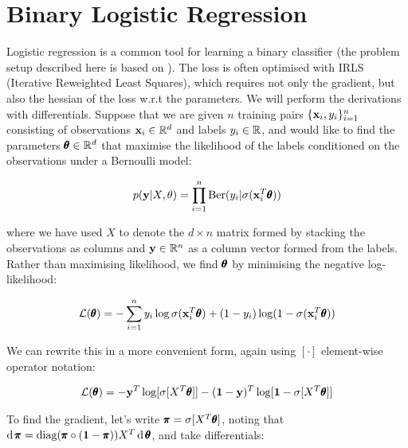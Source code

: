 \section{Binary Logistic Regression}

Logistic regression is a common tool for learning a binary classifier (the problem setup described here is based on \citep{defreitas}).  The loss is often optimised with IRLS (Iterative Reweighted Least Squares), which requires not only the gradient, but also the hessian of the loss w.r.t the parameters.  We will perform the derivations with differentials.  Suppose that we are given $n$ training pairs $\{\mathbf{x}_i, y_i\}_{i=1}^n$ consisting of observations $\mathbf{x}_i \in \mathbb{R}^d$ and labels $y_i \in \mathbb{R}$, and would like to find the parameters $\pmb{\theta} \in \mathbb{R}^d$ that maximise the likelihood of the labels conditioned on the observations under a Bernoulli model:

\begin{align*}
  p( \mathbf{y} | X, \mathbf{\theta}) = \prod_{i=1}^n \text{Ber}(y_i| \sigma(\mathbf{x}_i^T \pmb{\theta}))
\end{align*}

where we have used $X$ to denote the $d \times n$ matrix formed by stacking the observations as columns and $\mathbf{y} \in \mathbb{R}^{n} $ as a column vector formed from the labels.  Rather than maximising likelihood, we find $\pmb{\theta}$ by minimising the negative log-likelihood:

\begin{align*}
  \mathcal{L}(\pmb{\theta}) = - \sum_{i =1}^n y_i \log \sigma(\mathbf{x}_i^T\pmb{\theta}) + (1 - y_i) \log (1 - \sigma(\mathbf{x}_i^T \pmb{\theta}))
\end{align*}

We can rewrite this in a more convenient form, again using $[\cdot]$ element-wise operator notation:

\begin{align*}
  \mathcal{L}(\pmb{\theta}) = -\mathbf{y}^T \log[\sigma[X^T\pmb{\theta}]] - (\mathbf{1} - \mathbf{y})^T \log[\mathbf{1} - \sigma[X^T\pmb{\theta}]]
\end{align*}

To find the gradient, let's write $\pmb{\pi} = \sigma[X^T\pmb{\theta}]$, noting that $\operatorname{\text{d}} \pmb{\pi} = \operatorname{diag}(\pmb{\pi}\circ (\mathbf{1} - \pmb{\pi}))X^T \operatorname{\text{d}} \pmb{\theta}$, and take differentials:

